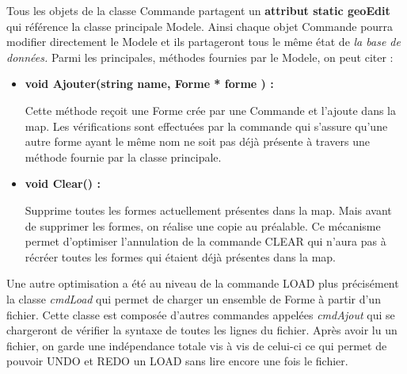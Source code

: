 \documentclass[12pt]{article}
\begin{document}
Tous les objets de la classe Commande partagent un \textbf{attribut static geoEdit} qui référence la classe principale Modele. Ainsi chaque objet Commande pourra modifier directement le Modele et ils partageront tous le même état de \textit{ la base de données.} Parmi les principales, méthodes fournies par le Modele, on peut citer :
\newline
\begin{itemize}
\item \textbf{void Ajouter(string name, Forme * forme ) :}

Cette méthode reçoit une Forme crée par une Commande et l’ajoute dans la map. Les vérifications sont effectuées par la commande qui s’assure qu’une autre forme ayant le même nom ne soit pas déjà présente à travers une méthode fournie par la classe principale.

\item \textbf{void Clear() :}

Supprime toutes les formes actuellement présentes dans la map. Mais avant de supprimer les formes, on réalise une copie au préalable. Ce mécanisme permet d’optimiser l’annulation de la commande CLEAR qui n’aura pas à récréer toutes les formes qui étaient déjà présentes dans la map.
\end{itemize}
Une autre optimisation a été au niveau de la commande LOAD plus précisément la classe \textit{ cmdLoad} qui permet de charger un ensemble de Forme à partir d'un fichier. Cette classe est composée d'autres commandes appelées \textit{cmdAjout} qui se chargeront de vérifier la syntaxe de toutes les lignes du fichier. Après avoir lu un fichier, on garde une indépendance totale vis à vis de celui-ci ce qui permet de pouvoir UNDO et REDO un LOAD sans lire encore une fois le fichier.
\end{document}
